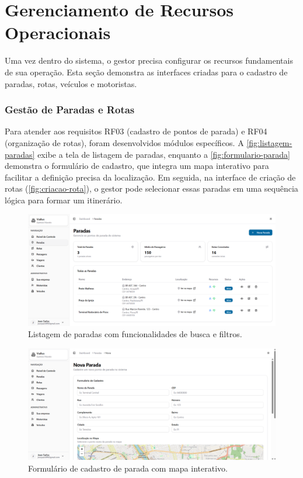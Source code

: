 \section{Gerenciamento de Recursos Operacionais}

Uma vez dentro do sistema, o gestor precisa configurar os recursos fundamentais de sua operação. Esta seção demonstra as interfaces criadas para o cadastro de paradas, rotas, veículos e motoristas.

\subsubsection{Gestão de Paradas e Rotas}
Para atender aos requisitos RF03 (cadastro de pontos de parada) e RF04 (organização de rotas), foram desenvolvidos módulos específicos. A \autoref{fig:listagem-paradas} exibe a tela de listagem de paradas, enquanto a \autoref{fig:formulario-parada} demonstra o formulário de cadastro, que integra um mapa interativo para facilitar a definição precisa da localização. Em seguida, na interface de criação de rotas (\autoref{fig:criacao-rota}), o gestor pode selecionar essas paradas em uma sequência lógica para formar um itinerário.

\begin{figure}[H]
  \centering
  \includegraphics[width=1\textwidth]{imagens/listagem-paradas.png}
  \caption{Listagem de paradas com funcionalidades de busca e filtros.}
  \label{fig:listagem-paradas}
\end{figure}

\begin{figure}[H]
  \centering
  \includegraphics[width=1\textwidth]{imagens/formulario-parada.png}
  \caption{Formulário de cadastro de parada com mapa interativo.}
  \label{fig:formulario-parada}
\end{figure}

